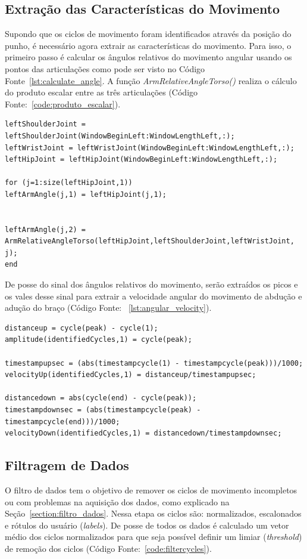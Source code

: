 \subsection{Extração das Características do Movimento}
Supondo que os ciclos de movimento foram identificados através da posição do punho, é necessário agora extrair as características do movimento. Para isso, o primeiro passo é calcular os ângulos relativos do movimento angular usando os pontos das articulações como pode ser visto no Código Fonte~\ref{lst:calculate_angle}. A função \textit{ArmRelativeAngleTorso()} realiza o cálculo do produto escalar entre as três articulações (Código Fonte:~\ref{code:produto_escalar}).

\begin{lstlisting}[frame=single, caption=Calcular ângulos relativos do movimento, label=lst:calculate_angle]
leftShoulderJoint = leftShoulderJoint(WindowBeginLeft:WindowLengthLeft,:);
leftWristJoint = leftWristJoint(WindowBeginLeft:WindowLengthLeft,:);  
leftHipJoint = leftHipJoint(WindowBeginLeft:WindowLengthLeft,:);  

for (j=1:size(leftHipJoint,1))
leftArmAngle(j,1) = leftHipJoint(j,1);
        

leftArmAngle(j,2) = ArmRelativeAngleTorso(leftHipJoint,leftShoulderJoint,leftWristJoint, j);    
end
\end{lstlisting}

De posse do sinal dos ângulos relativos do movimento, serão extraídos os picos e os vales desse sinal para  extrair a velocidade angular do movimento de abdução e adução do braço (Código Fonte: ~\ref{lst:angular_velocity}).
    
\begin{lstlisting}[frame=single, caption=Calcular Velociodade Angular Adução e Abdução, label=lst:angular_velocity]	
distanceup = cycle(peak) - cycle(1);
amplitude(identifiedCycles,1) = cycle(peak);
    
timestampupsec = (abs(timestampcycle(1) - timestampcycle(peak)))/1000;
velocityUp(identifiedCycles,1) = distanceup/timestampupsec;

distancedown = abs(cycle(end) - cycle(peak));
timestampdownsec = (abs(timestampcycle(peak) - timestampcycle(end)))/1000;
velocityDown(identifiedCycles,1) = distancedown/timestampdownsec;
\end{lstlisting}	
		
\subsection{Filtragem de Dados}
O filtro de dados tem o objetivo de remover os ciclos de movimento incompletos ou com problemas na aquisição dos dados, como explicado na Seção~\ref{section:filtro_dados}. Nessa etapa os ciclos são: normalizados, escalonados e rótulos do usuário (\textit{labels}). 
De posse de todos os dados é calculado um vetor médio dos ciclos normalizados para que seja possível definir um limiar (\textit{threshold}) de remoção dos ciclos (Código Fonte:~\ref{code:filtercycles}).

